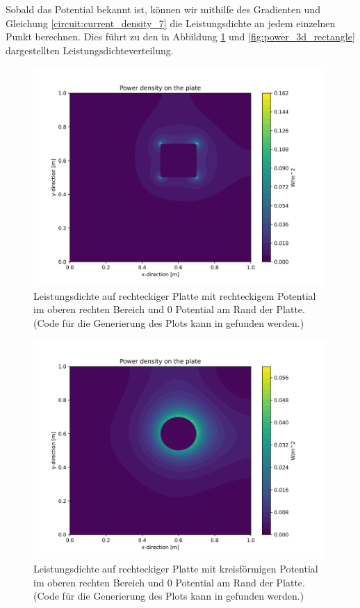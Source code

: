 Sobald das Potential bekannt ist, können wir mithilfe des Gradienten und Gleichung \eqref{circuit:current_density_7} die Leistungsdichte an jedem einzelnen Punkt berechnen. Dies führt zu den in Abbildung \ref{fig:power_2d} und \ref{fig:power_3d_rectangle} dargestellten Leistungsdichteverteilung.
\begin{figure}[h]
	\centering
	\includegraphics[width=0.99\textwidth]{papers/circuit/power_distribution.png}
	\caption{Leistungsdichte auf rechteckiger Platte mit rechteckigem Potential im oberen rechten Bereich und 0 Potential am Rand der Platte. (Code für die Generierung des Plots kann in \cite{github:AndreasFMueller} gefunden werden.)}
	\label{fig:power_2d}
\end{figure}
\begin{figure}[h]
	\centering
	\includegraphics[width=0.99\textwidth]{papers/circuit/power_distribution_circle.png}
	\caption{Leistungsdichte auf rechteckiger Platte mit kreisförmigen Potential im oberen rechten Bereich und 0 Potential am Rand der Platte. (Code für die Generierung des Plots kann in \cite{github:AndreasFMueller} gefunden werden.) }
	\label{fig:power_2d_circle}
\end{figure}
